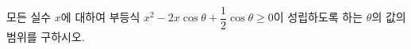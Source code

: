 모든 실수 $x$에 대하여 부등식 $x^2-2x\cos\theta+\dfrac{1}{2}\cos\theta\ge 0$이 성립하도록 하는 $\theta$의 값의 범위를 구하시오. \cond{$0\le\theta\le 2\pi$}

